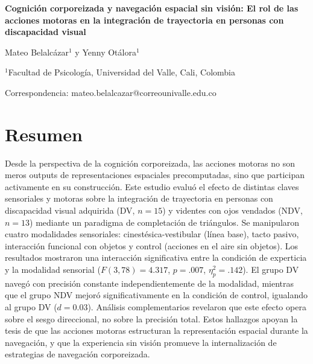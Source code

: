 \documentclass[12pt,letterpaper]{article}
\begin{document}
\begin{center}
{\Large\bfseries Cognición corporeizada y navegación espacial sin visión: El rol de las acciones motoras en la integración de trayectoria en personas con discapacidad visual}

\vspace{1cm}

{\large Mateo Belalcázar$^{1}$ y Yenny Otálora$^{1}$}

\vspace{0.5cm}

$^{1}$Facultad de Psicología, Universidad del Valle, Cali, Colombia

\vspace{0.5cm}

Correspondencia: mateo.belalcazar@correounivalle.edu.co

\end{center}

\vspace{1cm}

\section{Resumen}

Desde la perspectiva de la cognición corporeizada, las acciones motoras no son meros outputs de representaciones espaciales precomputadas, sino que participan activamente en su construcción. Este estudio evaluó el efecto de distintas claves sensoriales y motoras sobre la integración de trayectoria en personas con discapacidad visual adquirida (DV, $n = 15$) y videntes con ojos vendados (NDV, $n = 13$) mediante un paradigma de completación de triángulos. Se manipularon cuatro modalidades sensoriales: cinestésica-vestibular (línea base), tacto pasivo, interacción funcional con objetos y control (acciones en el aire sin objetos). Los resultados mostraron una interacción significativa entre la condición de experticia y la modalidad sensorial ($F(3,78) = 4.317$, $p = .007$, $\eta^2_p = .142$). El grupo DV navegó con precisión constante independientemente de la modalidad, mientras que el grupo NDV mejoró significativamente en la condición de control, igualando al grupo DV ($d = 0.03$). Análisis complementarios revelaron que este efecto opera sobre el sesgo direccional, no sobre la precisión total. Estos hallazgos apoyan la tesis de que las acciones motoras estructuran la representación espacial durante la navegación, y que la experiencia sin visión promueve la internalización de estrategias de navegación corporeizada.
\end{document}
